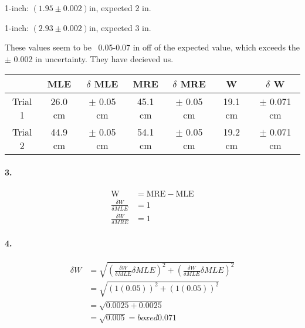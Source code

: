     1-inch: $(1.95 \pm 0.002)$in, expected 2 in.

    1-inch: $(2.93 \pm 0.002)$in, expected 3 in.

    These values seem to be ~0.05-0.07 in off of the expected value, which exceeds the $\pm$ 0.002 in uncertainty. They have decieved us.

    \begin{center}
        \begin{tabular}{| c | c | c | c | c | c | c |}
            \hline
            & MLE & $\delta$ MLE & MRE & $\delta$ MRE & W & $\delta$ W  \\
            \hline
            Trial 1 & 26.0 cm & $\pm$ 0.05 cm & 45.1 cm & $\pm$ 0.05 cm & 19.1 cm & $\pm$ 0.071 cm  \\
            \hline
            Trial 2 & 44.9 cm & $\pm$ 0.05 cm & 54.1 cm & $\pm$ 0.05 cm & 19.2 cm & $\pm$ 0.071 cm  \\
            \hline
        \end{tabular}
    \end{center}

    \paragraph*{3.}

    \begin{align*}
        \text{W}                        & = \text{MRE} - \text{MLE}     \\
        \frac{\delta W}{\delta MLE}     & = 1                           \\
        \frac{\delta W}{\delta MRE}     & = 1                           
    \end{align*}

    \paragraph*{4.}
    \begin{align*}
        \delta W    & = \sqrt{\left(\frac{\delta W}{\delta MLE}\delta MLE\right)^2 + \left(\frac{\delta W}{\delta MLE}\delta MLE\right)^2} \\
                    & = \sqrt{\left(1(0.05)\right)^2 + \left(1(0.05)\right)^2} \\
                    & = \sqrt{0.0025 + 0.0025}      \\
                    & = \sqrt{0.005} = boxed{0.071} \\
    \end{align*}

